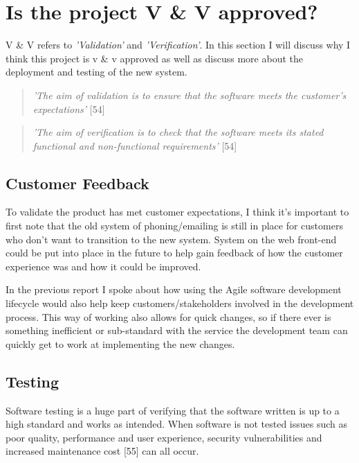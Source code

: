 \section{Is the project V \& V approved?}
  V \& V refers to \textit{'Validation'} and \textit{'Verification'}. In this section I will discuss why I think this project is v \&
  v approved as well as discuss more about the deployment and testing of the new system.

  \begin{quote}
    \textit{'The aim of validation is to ensure that the software meets the customer's expectations'} [54]
  \end{quote}

  \begin{quote}
    \textit{'The aim of verification is to check that the software meets its stated functional and non-functional requirements'} [54]
  \end{quote}


  \subsection{Customer Feedback}
  To validate the product has met customer expectations, I think it's important to first note that the old system of phoning/emailing is still in 
  place for customers who don't want to transition to the new system. System on the web front-end could be put into place in the future to help 
  gain feedback of how the customer experience was and how it could be improved.

  In the previous report I spoke about how using the Agile software development lifecycle would also help keep customers/stakeholders involved in the 
  development process. This way of working also allows for quick changes, so if there ever is something inefficient or sub-standard with the service the 
  development team can quickly get to work at implementing the new changes.
  
  \subsection{Testing}
  \label{sec:Testing}

  Software testing is a huge part of verifying that the software written is up to a high standard and works as intended. When software is not
  tested issues such as poor quality, performance and user experience, security vulnerabilities and increased maintenance cost [55] can all 
  occur.

